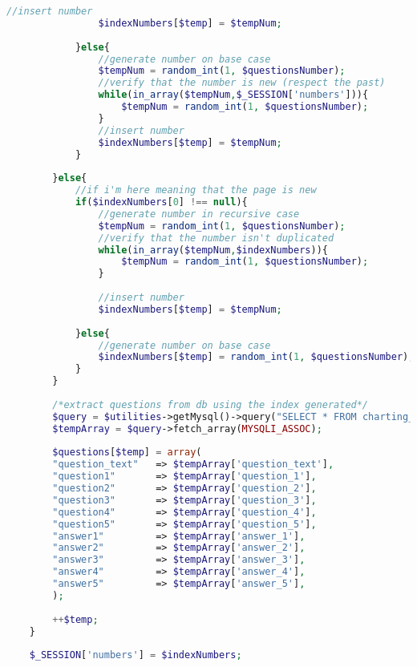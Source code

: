 \begin{lstlisting}[language=php]
				//insert number
				$indexNumbers[$temp] = $tempNum; 
				
			}else{
				//generate number on base case
				$tempNum = random_int(1, $questionsNumber);
				//verify that the number is new (respect the past)
				while(in_array($tempNum,$_SESSION['numbers'])){
					$tempNum = random_int(1, $questionsNumber);
				}
				//insert number
				$indexNumbers[$temp] = $tempNum; 
			}
			
		}else{
			//if i'm here meaning that the page is new
			if($indexNumbers[0] !== null){
				//generate number in recursive case
				$tempNum = random_int(1, $questionsNumber);
				//verify that the number isn't duplicated
				while(in_array($tempNum,$indexNumbers)){
					$tempNum = random_int(1, $questionsNumber);
				}
				
				//insert number
				$indexNumbers[$temp] = $tempNum;
				
			}else{
				//generate number on base case
				$indexNumbers[$temp] = random_int(1, $questionsNumber);
			}
		}
		
		/*extract questions from db using the index generated*/
		$query = $utilities->getMysql()->query("SELECT * FROM charting_elements WHERE (id = '{$indexNumbers[$temp]}')");
		$tempArray = $query->fetch_array(MYSQLI_ASSOC);
		
		$questions[$temp] = array(
		"question_text"   => $tempArray['question_text'],
		"question1"       => $tempArray['question_1'],
		"question2"       => $tempArray['question_2'],
		"question3"       => $tempArray['question_3'],
		"question4"       => $tempArray['question_4'],
		"question5"       => $tempArray['question_5'],
		"answer1"         => $tempArray['answer_1'],
		"answer2"         => $tempArray['answer_2'],
		"answer3"         => $tempArray['answer_3'],
		"answer4"         => $tempArray['answer_4'],
		"answer5"         => $tempArray['answer_5'],
		);
		
		++$temp;
	}
	
	$_SESSION['numbers'] = $indexNumbers;
\end{lstlisting}

